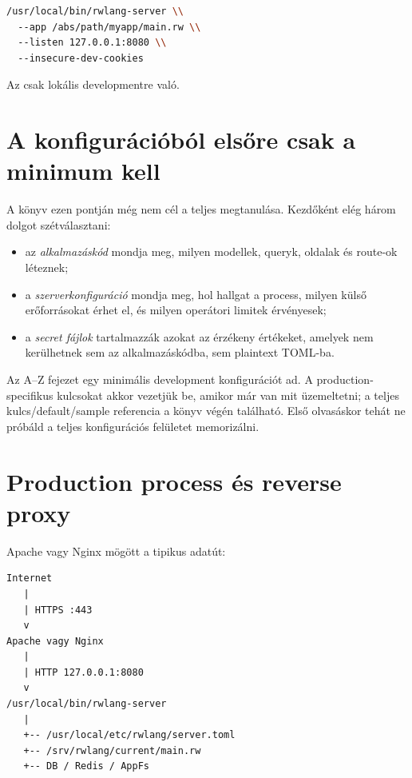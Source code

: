 \begin{lstlisting}[language=bash]
/usr/local/bin/rwlang-server \\
  --app /abs/path/myapp/main.rw \\
  --listen 127.0.0.1:8080 \\
  --insecure-dev-cookies
\end{lstlisting}

Az  csak lokális developmentre való.

\section{A konfigurációból elsőre csak a minimum kell}

A könyv ezen pontján még nem cél a teljes  megtanulása. Kezdőként elég három dolgot szétválasztani:

\begin{itemize}
  \item az \emph{alkalmazáskód} mondja meg, milyen modellek, queryk, oldalak és route-ok léteznek;
  \item a \emph{szerverkonfiguráció} mondja meg, hol hallgat a process, milyen külső erőforrásokat érhet el, és milyen operátori limitek érvényesek;
  \item a \emph{secret fájlok} tartalmazzák azokat az érzékeny értékeket, amelyek nem kerülhetnek sem az alkalmazáskódba, sem plaintext TOML-ba.
\end{itemize}

Az A--Z fejezet egy minimális development konfigurációt ad. A production-specifikus kulcsokat akkor vezetjük be, amikor már van mit üzemeltetni; a teljes kulcs/default/sample referencia a könyv végén található. Első olvasáskor tehát ne próbáld a teljes konfigurációs felületet memorizálni.

\section{Production process és reverse proxy}

Apache vagy Nginx mögött a tipikus adatút:

\begin{lstlisting}
Internet
   |
   | HTTPS :443
   v
Apache vagy Nginx
   |
   | HTTP 127.0.0.1:8080
   v
/usr/local/bin/rwlang-server
   |
   +-- /usr/local/etc/rwlang/server.toml
   +-- /srv/rwlang/current/main.rw
   +-- DB / Redis / AppFs
\end{lstlisting}


